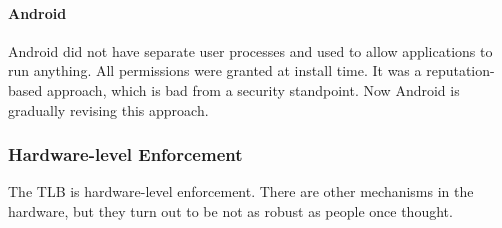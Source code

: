 \documentclass[twoside]{article}
\begin{document}
\paragraph{Android}

Android did not have separate user processes and used to allow applications to run anything. All permissions were granted at install time. It was a reputation-based approach, which is bad from a security standpoint. Now Android is gradually revising this approach.

\subsubsection{Hardware-level Enforcement}

The TLB is hardware-level enforcement. There are other mechanisms in the hardware, but they turn out to be not as robust as people once thought.
\end{document}
